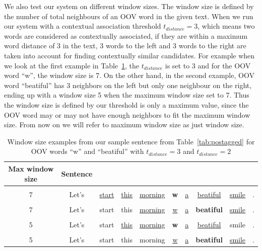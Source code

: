 \documentclass[a4paper,onesided,12pt]{report}
\begin{document}
We also test our system on different window sizes. The window size is defined by the number of total neighbours of an OOV word in the given text. When we run our system with a contextual association threshold $t_{distance}=3$, which means two words are considered as contextually associated, if they are within a maximum word distance of 3 in the text, 3 words to the left and 3 words to the right are taken into account for finding contextually similar candidates. For example when we look at the first example in Table~\ref{tab:windowsize}, the $t_{distance}$ is set to 3 and  for the OOV word ``w'', the window size is 7. On the other hand, in the second example, OOV word ``beatiful'' has 3 neighbors on the left but only one neighbour on the right, ending up with a window size 5 when the maximum window size set to 7. Thus the window size is defined by our threshold is only a maximum value, since the OOV word may or may not have enough neighbors to fit the maximum window size. From now on we will refer to maximum window size as just window size.

\begin{table}[thb]
  \caption{Window size examples from our sample sentence from Table~\ref{tab:postagged} for OOV words ``w'' and ``beatiful'' with $t_{distance}=3$ and $t_{distance}=2$}
  \centering
  \begin{tabular}{c|*9{c}}
    Max window size & Sentence \\
    \hline \\ \cline{3-9}
    7 & Let's & \multicolumn{1}{|c}{\underline{start}} & \underline{this} & \underline{morning} & \textbf{w} & \underline{a} & \underline{beatiful} & \multicolumn{1}{c|}{\underline{smile}} & . \\ \cline{3-9} \\[0.01cm]
    \cline{5-9}
    7 & Let's & start & this & \multicolumn{1}{|c}{\underline{morning}} &\underline{w} & \underline{a} & \textbf{beatiful} & \multicolumn{1}{c|}{\underline{smile}} &. \\ \cline{5-9}  \\[0.01cm]
    \cline{4-8}
    5 & Let's & start & \multicolumn{1}{|c}{\underline{this}} & \underline{morning} & \textbf{w} & \underline{a} & \multicolumn{1}{c|}{\underline{beatiful}} & smile & . \\ \cline{4-8} \\[0.01cm]
    \cline{6-9}
    5 & Let's & start & this & morning & \multicolumn{1}{|c}{\underline{w}} & \underline{a} & \textbf{beatiful} & \multicolumn{1}{c|}{\underline{smile}} & . \\ \cline{6-9}
  \end{tabular}
\label{tab:windowsize}
\end{table}
\end{document}
